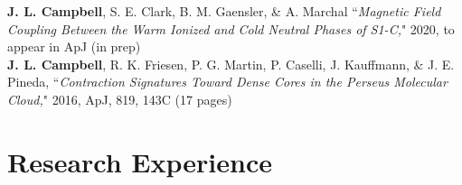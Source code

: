 \documentclass[10pt]{res} %
\begin{document}
\begin{resume}
\textbf{J. L. Campbell}, S. E. Clark, B. M. Gaensler, \& A. Marchal ``\textit{Magnetic Field Coupling Between the Warm Ionized and Cold Neutral Phases of S1-C,}" 2020, to appear in ApJ (in prep) \\
\textbf{J. L. Campbell}, R. K. Friesen, P. G. Martin, P. Caselli, J. Kauffmann, \& J. E. Pineda, ``\textit{Contraction Signatures Toward Dense Cores in the Perseus Molecular Cloud,}" 2016, ApJ, 819, 143C (17 pages)

\newpage
\section{\Large Research Experience}
\vspace{-5pt} %
\noindent\makebox[\linewidth]{\rule{\textwidth}{0.4pt}}
\vspace{-20pt} %


\end{resume}
\end{document}
